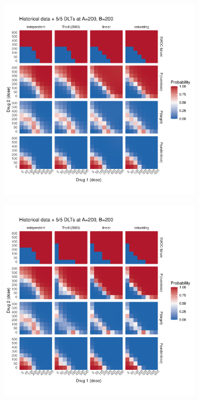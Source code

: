 \documentclass[AMA,STIX1COL]{WileyNJD-v2}
\begin{document}
\begin{figure}
\centering
{
\begin{subfigure}[t]{.45\linewidth}
\caption{} \label{fig:prior_histdata_5_5_200_05}
{\includegraphics[width=240pt]{figures/ggplot_mu_sd_inter_0_5_Historical_data_+_5_5_DLTs_at_A=200_B=200.pdf}}
\end{subfigure}
\hspace{1mm}
\begin{subfigure}[t]{.45\linewidth}
\caption{} \label{fig:prior_histdata_5_5_200_15}
{\includegraphics[width=240pt]{figures/ggplot_mu_sd_inter_1_5_Historical_data_+_5_5_DLTs_at_A=200_B=200.pdf}}
\end{subfigure}
\\
\begin{subfigure}[t]{.45\linewidth}
\caption{} \label{fig:prior_histdata_5_5_100_05}

\end{subfigure}}
\end{figure}
\end{document}
